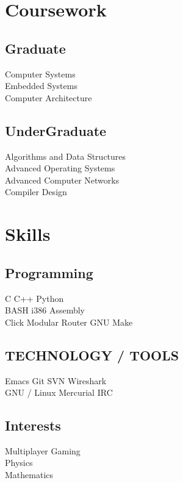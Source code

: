 \documentclass[letterpaper]{deedy-resume-openfont} %
\begin{document}
\begin{minipage}[t]{0.33\textwidth}
\section{Coursework}
\subsection{Graduate}
Computer Systems \\
Embedded Systems \\
Computer Architecture \\
\sectionsep

\subsection{UnderGraduate}
Algorithms and Data Structures \\
Advanced Operating Systems \\
Advanced Computer Networks \\
Compiler Design \\
\sectionsep %
\section{Skills}
\subsection{Programming}
C \textbullet{} C++ \textbullet{} Python \\
BASH \textbullet{} i386 Assembly \\
Click Modular Router  \textbullet{} GNU Make \\
\sectionsep %
\subsection{TECHNOLOGY / TOOLS}
Emacs \textbullet{} Git \textbullet{} SVN  \textbullet{} Wireshark \\
GNU / Linux \textbullet{} Mercurial \textbullet{}
IRC   
\sectionsep %
\subsection{Interests}
Multiplayer Gaming \\
Physics \\
Mathematics \\
\sectionsep %

\end{minipage} %
\end{document}
